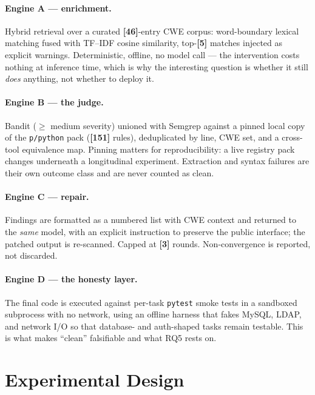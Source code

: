 \documentclass[10pt,conference]{article}
\newcommand{\PLACEHOLDER}[1]{{\color{placeholderred}\textbf{[#1]}}}
\begin{document}


\paragraph{Engine A --- enrichment.} Hybrid retrieval over a curated
\PLACEHOLDER{46}-entry CWE corpus: word-boundary lexical matching fused with
TF--IDF cosine similarity, top-\PLACEHOLDER{5} matches injected as explicit
warnings. Deterministic, offline, no model call --- the intervention costs
nothing at inference time, which is why the interesting question is whether it
still \emph{does} anything, not whether to deploy it.

\paragraph{Engine B --- the judge.} Bandit ($\ge$ medium severity) unioned with
Semgrep against a pinned local copy of the \texttt{p/python} pack
(\PLACEHOLDER{151} rules), deduplicated by line, CWE set, and a cross-tool
equivalence map. Pinning matters for reproducibility: a live registry pack
changes underneath a longitudinal experiment. Extraction and syntax failures are
their own outcome class and are never counted as clean.

\paragraph{Engine C --- repair.} Findings are formatted as a numbered list with
CWE context and returned to the \emph{same} model, with an explicit instruction
to preserve the public interface; the patched output is re-scanned. Capped at
\PLACEHOLDER{3} rounds. Non-convergence is reported, not discarded.

\paragraph{Engine D --- the honesty layer.} The final code is executed against
per-task \texttt{pytest} smoke tests in a sandboxed subprocess with no network,
using an offline harness that fakes MySQL, LDAP, and network I/O so that
database- and auth-shaped tasks remain testable. This is what makes
``clean'' falsifiable and what RQ5 rests on.

\section{Experimental Design}\label{sec:design}
\end{document}
